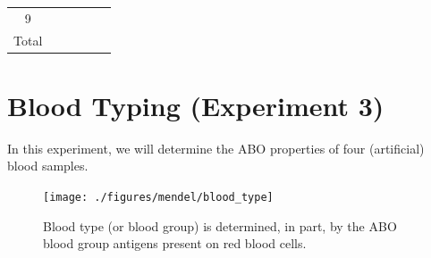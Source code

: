 \documentclass[]{book}
\begin{document}
\begin{longtable}[]{@{}clllll@{}}
\begin{minipage}[t]{0.04\columnwidth}
9\strut
\end{minipage} & \begin{minipage}[t]{0.19\columnwidth}\raggedright
\strut
\end{minipage} & \begin{minipage}[t]{0.19\columnwidth}\raggedright
\strut
\end{minipage} & \begin{minipage}[t]{0.19\columnwidth}\raggedright
\strut
\end{minipage} & \begin{minipage}[t]{0.19\columnwidth}\raggedright
\strut
\end{minipage} & \begin{minipage}[t]{0.03\columnwidth}\raggedright
\strut
\end{minipage}\tabularnewline
\begin{minipage}[t]{0.04\columnwidth}\centering
Total\strut
\end{minipage} & \begin{minipage}[t]{0.19\columnwidth}\raggedright
\strut
\end{minipage} & \begin{minipage}[t]{0.19\columnwidth}\raggedright
\strut
\end{minipage} & \begin{minipage}[t]{0.19\columnwidth}\raggedright
\strut
\end{minipage} & \begin{minipage}[t]{0.19\columnwidth}\raggedright
\strut
\end{minipage} & \begin{minipage}[t]{0.03\columnwidth}\raggedright
\strut
\end{minipage}\tabularnewline
\bottomrule
\end{longtable}

\hypertarget{blood-typing-experiment-3}{%
\section{Blood Typing (Experiment 3)}\label{blood-typing-experiment-3}}

In this experiment, we will determine the ABO properties of four (artificial) blood samples.



\begin{figure}

{\centering \texttt{[image: ./figures/mendel/blood\_type]} 

}

\caption{Blood type (or blood group) is determined, in part, by the ABO blood group antigens present on red blood cells.}\label{fig:type}
\end{figure}
\end{document}

